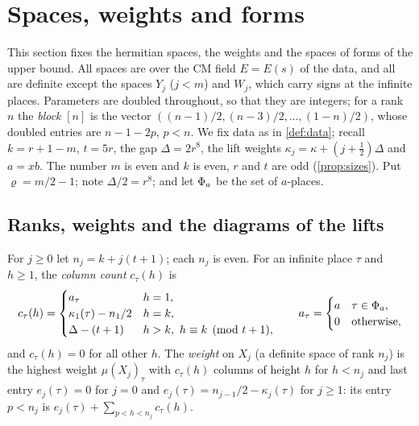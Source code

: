 \section{Spaces, weights and forms}\label{sec:spaces}

This section fixes the hermitian spaces, the weights and the spaces of forms of the upper bound. All
spaces are over the CM field $E=E(s)$ of the data, and all are definite except the spaces $Y_j$
($j<m$) and $W_j$, which carry signs at the infinite places. Parameters are doubled throughout, so
that they are integers; for a rank $n$ the \emph{block} $[n]$ is the vector
$((n-1)/2,(n-3)/2,\dots,(1-n)/2)$, whose doubled entries are $n-1-2p$, $p<n$. We fix data as in
\cref{def:data}; recall $k=r+1-m$, $t=5r$, the gap $\Delta=2r^8$, the lift weights
$\kappa_j=\kappa+(j+\frac12)\Delta$ and $a=xb$. The number $m$ is even and $k$ is even, $r$ and $t$
are odd (\cref{prop:sizes}). Put $\varrho=m/2-1$; note $\Delta/2=r^8$; and let $\Phi_a$ be the set of
$a$-places.

\subsection{Ranks, weights and the diagrams of the lifts}\label{ss:ranks-weights}
For $j\ge0$ let $n_j=k+j(t+1)$; each $n_j$ is even. For an infinite place $\tau$ and $h\ge1$, the
\emph{column count} $c_\tau(h)$ is
\[
  c_\tau(h)=\begin{cases}
    a_\tau&h=1,\\
    \kappa_1(\tau)-n_1/2&h=k,\\
    \Delta-(t+1)&h>k,\ h\equiv k\pmod{t+1},
  \end{cases}
  \qquad a_\tau=\begin{cases}a&\tau\in\Phi_a,\\0&\text{otherwise,}\end{cases}
\]
and $c_\tau(h)=0$ for all other $h$. The \emph{weight} on $X_j$ (a definite space of rank $n_j$) is the
highest weight $\mu(X_j)_\tau$ with $c_\tau(h)$ columns of height $h$ for $h<n_j$ and last entry
$e_j(\tau)=0$ for $j=0$ and $e_j(\tau)=n_{j-1}/2-\kappa_j(\tau)$ for $j\ge1$: its entry $p<n_j$ is
$e_j(\tau)+\sum_{p<h<n_j}c_\tau(h)$.

